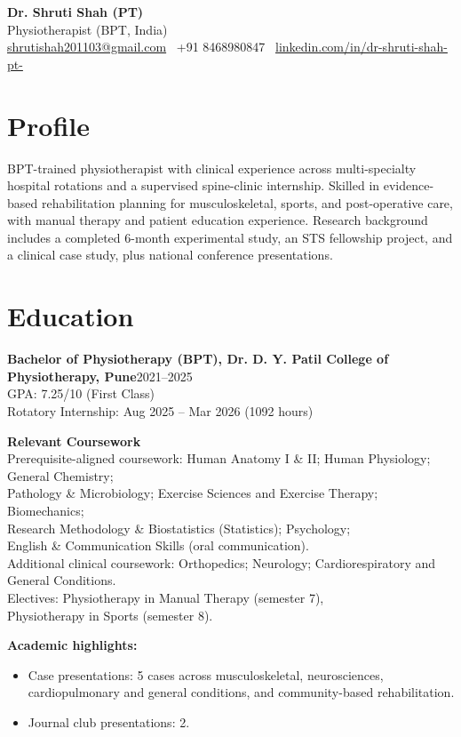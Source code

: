\documentclass[11pt]{article}
\newcommand{\cvsubheading}[2]{\textbf{#1}\hfill #2\\}
\begin{document}
\begin{center}
{\LARGE \textbf{Dr. Shruti Shah (PT)}}\\
Physiotherapist (BPT, India)\\
\small \href{mailto:shrutishah201103@gmail.com}{shrutishah201103@gmail.com} \textbar\ +91 8468980847 \textbar\ \href{https://www.linkedin.com/in/dr-shruti-shah-pt-}{linkedin.com/in/dr-shruti-shah-pt-}\normalsize
\end{center}

\section*{Profile}
BPT-trained physiotherapist with clinical experience across multi-specialty hospital rotations and a supervised spine-clinic internship. Skilled in evidence-based rehabilitation planning for musculoskeletal, sports, and post-operative care, with manual therapy and patient education experience. Research background includes a completed 6-month experimental study, an STS fellowship project, and a clinical case study, plus national conference presentations.

\section*{Education}
\cvsubheading{Bachelor of Physiotherapy (BPT), Dr. D. Y. Patil College of Physiotherapy, Pune}{2021--2025}
GPA: 7.25/10 (First Class)\\
Rotatory Internship: Aug 2025 -- Mar 2026 (1092 hours)

\textbf{Relevant Coursework}\\
Prerequisite-aligned coursework: Human Anatomy I \& II; Human Physiology; General Chemistry;\\
Pathology \& Microbiology; Exercise Sciences and Exercise Therapy; Biomechanics;\\
Research Methodology \& Biostatistics (Statistics); Psychology;\\
English \& Communication Skills (oral communication).\\
Additional clinical coursework: Orthopedics; Neurology; Cardiorespiratory and General Conditions.\\
Electives: Physiotherapy in Manual Therapy (semester 7),\\
Physiotherapy in Sports (semester 8).

\textbf{Academic highlights:}
\begin{itemize}
  \item Case presentations: 5 cases across musculoskeletal, neurosciences, cardiopulmonary and general conditions, and community-based rehabilitation.
  \item Journal club presentations: 2.
\end{itemize}
\end{document}
